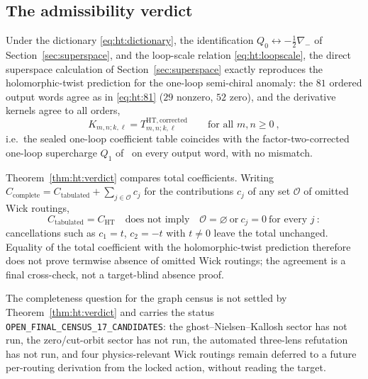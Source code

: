 \subsection{The admissibility verdict}\label{subsec:ht:verdict}

\begin{theorem}\label{thm:ht:verdict}
Under the dictionary \eqref{eq:ht:dictionary}, the identification
$Q_{0}\leftrightarrow-\tfrac12\nabla_{-}$ of
Section~\ref{sec:superspace}, and the loop-scale relation
\eqref{eq:ht:loopscale}, the direct superspace calculation of
Section~\ref{sec:superspace} exactly reproduces the holomorphic-twist
prediction for the one-loop semi-chiral anomaly: the $81$ ordered output
words agree as in \eqref{eq:ht:81} ($29$ nonzero, $52$ zero), and the
derivative kernels agree to all orders,
\begin{equation}\label{eq:ht:verdict}
K_{m,n;k,\ell}=T^{\mathrm{HT,corrected}}_{m,n;k,\ell}
\qquad\text{for all }m,n\ge0 \ ,
\end{equation}
i.e.\ the sealed one-loop coefficient table coincides with the
factor-two-corrected one-loop supercharge $Q_{1}$ of~\cite{BK} on every
output word, with no mismatch.
\end{theorem}

\begin{remark}\label{rem:ht:cr23}
Theorem~\ref{thm:ht:verdict} compares total coefficients. Writing
$C_{\mathrm{complete}}=C_{\mathrm{tabulated}}+\sum_{j\in\mathcal O}c_{j}$ for
the contributions $c_{j}$ of any set $\mathcal O$ of omitted Wick routings,
\begin{equation}\label{eq:ht:cr23}
C_{\mathrm{tabulated}}=C_{\mathrm{HT}}
\quad\text{does not imply}\quad
\mathcal O=\varnothing
\ \text{or}\ c_{j}=0\ \text{for every }j \ :
\end{equation}
cancellations such as $c_{1}=t$, $c_{2}=-t$ with $t\neq0$ leave the total
unchanged. Equality of the total coefficient with the holomorphic-twist
prediction therefore does not prove termwise absence of omitted Wick
routings; the agreement is a final cross-check, not a target-blind absence
proof.
\end{remark}

\begin{remark}\label{rem:ht:open}
The completeness question for the graph census is not settled by
Theorem~\ref{thm:ht:verdict} and carries the status
\texttt{OPEN\_FINAL\_CENSUS\_17\_CANDIDATES}: the
ghost--Nielsen--Kallosh sector has not run, the zero/cut-orbit sector has not
run, the automated three-lens refutation has not run, and four
physics-relevant Wick routings remain deferred to a future per-routing
derivation from the locked action, without reading the target.
\end{remark}

